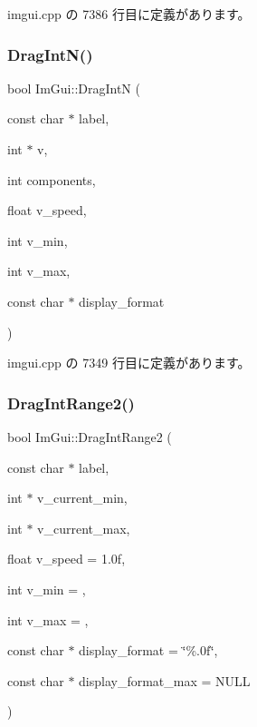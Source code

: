  imgui.\+cpp の 7386 行目に定義があります。

\mbox{\label{namespace_im_gui_a2854d672b818938e6e9fb1de6de3dbe7}} 
\subsubsection{\texorpdfstring{Drag\+Int\+N()}{DragIntN()}}
{\footnotesize\ttfamily bool Im\+Gui\+::\+Drag\+IntN (\begin{DoxyParamCaption}\item[{const char $\ast$}]{label,  }\item[{int $\ast$}]{v,  }\item[{int}]{components,  }\item[{float}]{v\+\_\+speed,  }\item[{int}]{v\+\_\+min,  }\item[{int}]{v\+\_\+max,  }\item[{const char $\ast$}]{display\+\_\+format }\end{DoxyParamCaption})}



 imgui.\+cpp の 7349 行目に定義があります。

\mbox{\label{namespace_im_gui_a6aaacf92126bf45ce0e58348b5297a43}} 
\subsubsection{\texorpdfstring{Drag\+Int\+Range2()}{DragIntRange2()}}
{\footnotesize\ttfamily bool Im\+Gui\+::\+Drag\+Int\+Range2 (\begin{DoxyParamCaption}\item[{const char $\ast$}]{label,  }\item[{int $\ast$}]{v\+\_\+current\+\_\+min,  }\item[{int $\ast$}]{v\+\_\+current\+\_\+max,  }\item[{float}]{v\+\_\+speed = {\ttfamily 1.0f},  }\item[{int}]{v\+\_\+min = {},  }\item[{int}]{v\+\_\+max = {},  }\item[{const char $\ast$}]{display\+\_\+format = {\ttfamily \char`\"{}\%.0f\char`\"{}},  }\item[{const char $\ast$}]{display\+\_\+format\+\_\+max = {\ttfamily NULL} }\end{DoxyParamCaption})}



